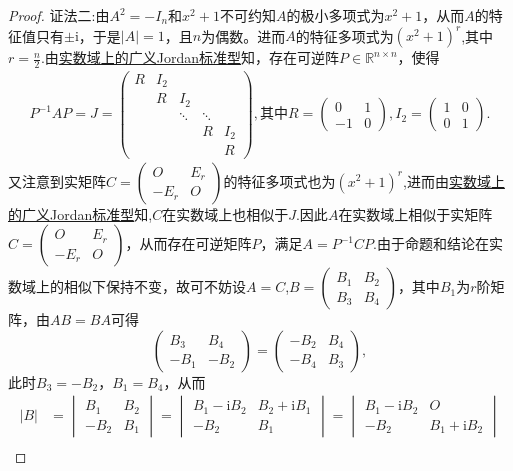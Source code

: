 \documentclass[../../main.tex]{subfiles}
\begin{document}
\begin{proof}
{\color{blue} 证法二:}由\(A^2 = -I_n\)和\(x^2 + 1\)不可约知\(A\)的极小多项式为\(x^2 + 1\)，从而\(A\)的特征值只有\(\pm \mathrm{i}\)，于是\(|A| = 1\)，且\(n\)为偶数。进而\(A\)的特征多项式为\((x^2 + 1)^r\),其中$r=\frac{n}{2}$.由\hyperref[theorem:实数域上的广义Jordan标准型]{实数域上的广义Jordan标准型}知，存在可逆阵\(P \in \mathbb{R}^{n \times n}\)，使得
\begin{align*}
P^{-1}AP = J = \begin{pmatrix}
R & I_2 &  &  &  \\
 & R & I_2 &  &  \\
 &  & \ddots & \ddots &  \\
 &  &  & R & I_2 \\
 &  &  &  & R
\end{pmatrix},\text{其中}R = \begin{pmatrix} 0 & 1 \\ -1 & 0 \end{pmatrix},I_2 = \begin{pmatrix} 1 & 0 \\ 0 & 1 \end{pmatrix}.
\end{align*}
又注意到实矩阵$C = \begin{pmatrix} O & E_r \\ -E_r & O \end{pmatrix}$的特征多项式也为\((x^2 + 1)^r\),进而由\hyperref[theorem:实数域上的广义Jordan标准型]{实数域上的广义Jordan标准型}知,$C$在实数域上也相似于$J$.因此$A$在实数域上相似于实矩阵$C = \begin{pmatrix} O & E_r \\ -E_r & O \end{pmatrix}$，从而存在可逆矩阵$P$，满足$A = P^{-1}CP$.由于命题和结论在实数域上的相似下保持不变，故可不妨设$A=C$,$B = \begin{pmatrix} B_1 & B_2 \\ B_3 & B_4 \end{pmatrix}$，其中$B_1$为$r$阶矩阵，由$AB=BA$可得
$$
\begin{pmatrix} B_3 & B_4 \\ -B_1 & -B_2 \end{pmatrix} = \begin{pmatrix} -B_2 & B_4 \\ -B_4 & B_3 \end{pmatrix},
$$
此时$B_3 = -B_2$，$B_1 = B_4$，从而
\begin{align*}
|B| & = \begin{vmatrix} B_1 & B_2 \\ -B_2 & B_1 \end{vmatrix} = \begin{vmatrix} B_1 - \text{i}B_2 & B_2 + \text{i}B_1 \\ -B_2 & B_1 \end{vmatrix} = \begin{vmatrix} B_1 -  \text{i}B_2 & O \\ -B_2 & B_1 + \text{i}B_2 \end{vmatrix} \\

\end{align*}
\end{proof}
\end{document}
